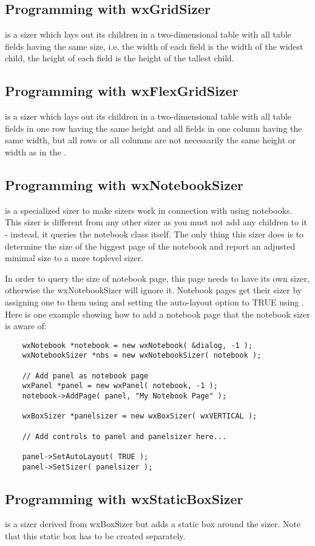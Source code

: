 \subsection{Programming with wxGridSizer}\label{gridsizerprogramming}

 is a sizer which lays out its children in a two-dimensional
table with all table fields having the same size,
i.e. the width of each field is the width of the widest child,
the height of each field is the height of the tallest child.

\subsection{Programming with wxFlexGridSizer}\label{flexgridsizerprogramming}

 is a sizer which lays out its children in a two-dimensional
table with all table fields in one row having the same
height and all fields in one column having the same width, but all
rows or all columns are not necessarily the same height or width as in
the .

\subsection{Programming with wxNotebookSizer}\label{notebooksizerprogramming}

 is a specialized sizer to make sizers work in connection
with using notebooks. This sizer is different from any other sizer as 
you must not add any children to it - instead, it queries the notebook class itself.
The only thing this sizer does is to determine the size of the biggest
page of the notebook and report an adjusted minimal size to a more toplevel
sizer.

In order to query the size of notebook page, this page needs to have its
own sizer, otherwise the wxNotebookSizer will ignore it. Notebook pages
get their sizer by assigning one to them using  
and setting the auto-layout option to TRUE using 
. Here is one
example showing how to add a notebook page that the notebook sizer is
aware of:

\begin{verbatim}
    wxNotebook *notebook = new wxNotebook( &dialog, -1 );
    wxNotebookSizer *nbs = new wxNotebookSizer( notebook );

    // Add panel as notebook page
    wxPanel *panel = new wxPanel( notebook, -1 );
    notebook->AddPage( panel, "My Notebook Page" );

    wxBoxSizer *panelsizer = new wxBoxSizer( wxVERTICAL );

    // Add controls to panel and panelsizer here...

    panel->SetAutoLayout( TRUE );
    panel->SetSizer( panelsizer );
\end{verbatim}

\subsection{Programming with wxStaticBoxSizer}\label{staticboxsizerprogramming}

 is a sizer derived from wxBoxSizer but adds a static
box around the sizer. Note that this static box has to be created 
separately.

